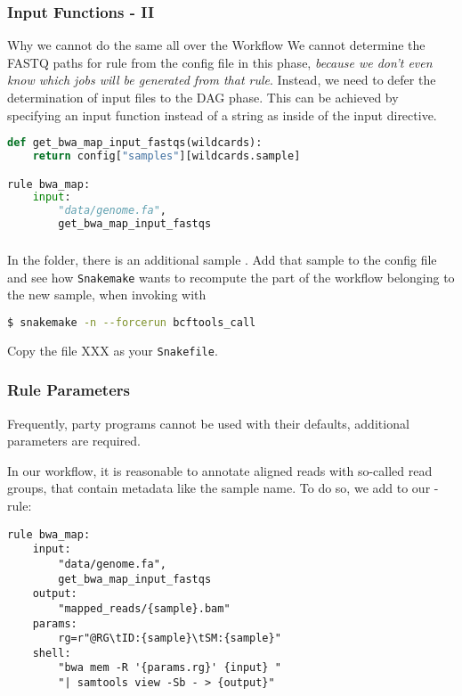 \begin{frame}[fragile]
  \frametitle{Input Functions - II}
    \begin{alertblock}{Why we cannot do the same all over the Workflow}
    We cannot determine the FASTQ paths for rule  from the config file in this phase, \emph{because we don’t even know which jobs will be generated from that rule}. Instead, we need to defer the determination of input files to the DAG phase. This can be achieved by specifying an input function instead of a string as inside of the input directive.
  \end{alertblock}
  \begin{lstlisting}[language=Python,style=Python]
def get_bwa_map_input_fastqs(wildcards):
    return config["samples"][wildcards.sample]

rule bwa_map:
    input:
        "data/genome.fa",
        get_bwa_map_input_fastqs
  \end{lstlisting}
\end{frame}

\begin{frame}[fragile]
  \frametitle{}
  In the  folder, there is an additional sample . Add that sample to the config file and see how \texttt{Snakemake} wants to recompute the part of the workflow belonging to the new sample, when invoking with 
  \begin{lstlisting}[language=Bash, style=Shell]
$ snakemake -n --forcerun bcftools_call
  \end{lstlisting}
  Copy the file XXX as your \texttt{Snakefile}. 
\end{frame}

\begin{frame}[fragile]
  \frametitle{Rule Parameters}
  \begin{warning}
  	Frequently, party programs cannot be used with their defaults, additional parameters are required.
  \end{warning}
  In our workflow, it is reasonable to annotate aligned reads with so-called read groups, that contain metadata like the sample name. \newline
  To do so, we add to our -rule:
  \begin{lstlisting}[style=Plain,basicstyle=\footnotesize]
rule bwa_map:
    input:
        "data/genome.fa",
        get_bwa_map_input_fastqs
    output:
        "mapped_reads/{sample}.bam"
    params:
        rg=r"@RG\tID:{sample}\tSM:{sample}"
    shell:
        "bwa mem -R '{params.rg}' {input} "
        "| samtools view -Sb - > {output}"
  \end{lstlisting}
\end{frame}

